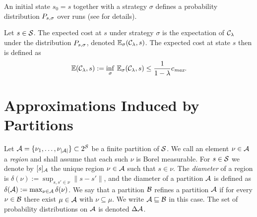 \documentclass{llncs}
\begin{document}
An initial state $s_0=s$ together with a strategy $\sigma$ defines a probability distribution
$P_{s,\sigma}$ over runs (see \cite{jaeger2020approximating}  for details).

\begin{definition}
  Let $s\in\mathcal{S}$. The expected cost at $s$ under strategy $\sigma$ is the expectation
  of $\mathcal{C}_{\lambda}$ under the distribution  $P_{s,\sigma}$, denoted
  $\mathbb{E}_{\sigma}(\mathcal{C}_{\lambda}, s)$. The expected cost at  state $s$ then is
  defined as
  \begin{equation}
  \label{eq:expcost}
    \mathbb{E}(\mathcal{C}_{\lambda}, s) :=\inf_{\sigma}\, \mathbb{E}_{\sigma}(\mathcal{C}_{\lambda},s) \leq \frac{1}{1-\lambda}c_{\emph{max}}.
  \end{equation}
\end{definition}




\section{Approximations Induced by Partitions}
\label{sec:partitionsapprox}

Let $\mathcal{A} = \{\nu_1,\ldots,\nu_{|\mathcal{A}|}\}\subset  2^{\mathcal{S}}$ be a finite
partition of $\mathcal{S}$.
We  call an element $\nu\in\mathcal{A}$ a
\emph{region}  and  shall  assume  that   each  such  $\nu$  is  Borel
measurable.  For $s\in\mathcal{S}$ we
denote by  $[s]_{\mathcal{A}}$ the unique region  $\nu\in\mathcal{A}$ such
that  $s\in\nu$.
The \emph{diameter} of a region is $\delta(\nu):=\sup_{s,s'\in\nu}\parallel s-s'\parallel$, and
 the diameter of a partition
$\mathcal{A}$ is defined as  
$\delta(\mathcal{A}):=\max_{\nu\in\mathcal{A}} \delta(\nu) $.
We say that a partition $\mathcal{B}$ refines
a partition $\mathcal{A}$  if for every $\nu\in\mathcal{B}$ there exist
$\mu\in\mathcal{A}$     with     $\nu\subseteq\mu$.     We     write
$\mathcal{A}\sqsubseteq\mathcal{B}$ in this case. The set of probability distributions on $\mathcal{A}$ is
denoted $\Delta\mathcal{A}$.


\end{document}
